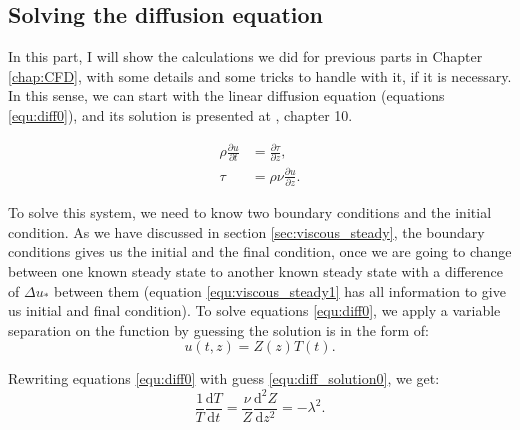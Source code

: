 
\begin{anexosenv}
\partanexos


\chapter{Solving the diffusion equation}
\label{chap:Calculations}
    In this part, I will show the calculations we did for previous parts in Chapter \ref{chap:CFD}, with some details and some tricks to handle with it, if it is necessary. In this sense, we can start with the linear diffusion equation (equations \ref{equ:diff0}), and its solution is presented at \cite{Boyce}, chapter 10.

    \begin{subequations}
        \begin{align}
            \rho \frac{\partial u}{\partial t} &= \frac{\partial \tau}{\partial z}, \\
            \tau &= \rho \nu \frac{\partial u}{\partial z}.
        \end{align}
        \label{equ:diff0}
    \end{subequations}

    To solve this system, we need to know two boundary conditions and the initial condition. As we have discussed in section \ref{sec:viscous_steady}, the boundary conditions gives us the initial and the final condition, once we are going to change between one known steady state to another known steady state with a difference of $\Delta u_*$ between them (equation \ref{equ:viscous_steady1} has all information to give us initial and final condition). To solve equations \ref{equ:diff0}, we apply a variable separation on the function by guessing the solution is in the form of:
    \begin{equation}
        u(t,z) = Z(z) T(t).
        \label{equ:diff_solution0}
    \end{equation}

    Rewriting equations \ref{equ:diff0} with guess \ref{equ:diff_solution0}, we get:
    \begin{equation}
        \frac{1}{T}\frac{\mathrm{d} T}{\mathrm{d} t} = \frac{\nu}{Z}\frac{\mathrm{d}^2 Z}{\mathrm{d} z^2} = -\lambda^2.
    \end{equation}


\end{anexosenv}

